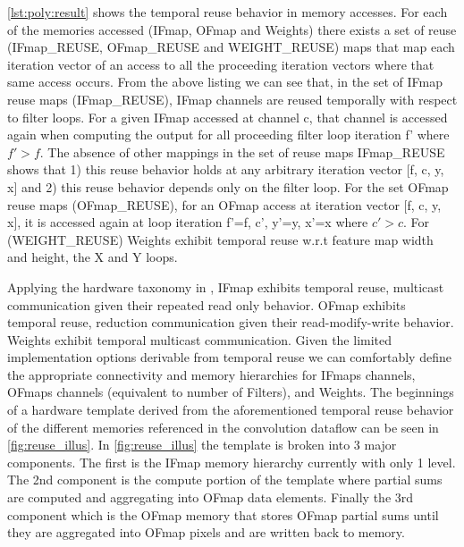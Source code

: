 \autoref{lst:poly:result} shows the temporal reuse behavior in memory accesses. For each
of the memories accessed (IFmap, OFmap and Weights) there exists a set of reuse
(IFmap\_REUSE, OFmap\_REUSE and WEIGHT\_REUSE) maps that map each iteration
vector of an access to all the proceeding iteration vectors where that same
access occurs. From the above listing we can see that, in the set of IFmap reuse
maps (IFmap\_REUSE), IFmap channels are reused temporally with respect to filter
loops. For a given IFmap accessed at channel c, that channel is accessed again
when computing the output for all proceeding filter loop iteration f' where
$f'>f$. The absence of other mappings in the set of reuse maps IFmap\_REUSE shows
that 1) this reuse behavior holds at any arbitrary iteration vector [f, c, y, x]
and 2) this reuse behavior depends only on the filter loop. For the set OFmap
reuse maps (OFmap\_REUSE), for an OFmap access at iteration vector [f, c, y,
x], it is accessed again at loop iteration f'=f, c', y'=y, x'=x where $c'>c$.  
For (WEIGHT\_REUSE) Weights exhibit temporal reuse w.r.t feature map width and
height, the X and Y loops. 

Applying the hardware taxonomy in \cite{maestro}, IFmap exhibits temporal reuse,
multicast communication given their repeated read only behavior. OFmap exhibits temporal reuse, reduction communication
given their read-modify-write behavior. Weights exhibit temporal multicast
communication. Given the limited implementation options derivable from temporal
reuse we can comfortably define the appropriate connectivity and memory
hierarchies for IFmaps channels, OFmaps channels (equivalent to number of
Filters), and Weights. The beginnings of a hardware template derived from the
aforementioned temporal reuse behavior of the different memories referenced in
the convolution dataflow can be seen in \ref{fig:reuse_illus}. In
\ref{fig:reuse_illus} the template is broken into 3 major components. The first
is the IFmap memory hierarchy currently with only 1 level. The 2nd component is
the compute portion of the template where partial sums are computed and
aggregating into OFmap data elements. Finally the 3rd component which is the
OFmap memory that stores OFmap partial sums until they are aggregated into OFmap
pixels and are written back to memory.

